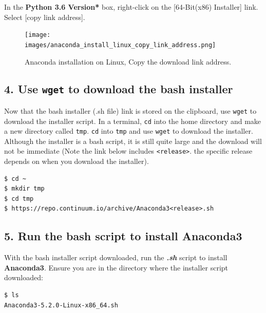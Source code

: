 \documentclass{book}
\begin{document}
In the \textbf{Python 3.6 Version* } box, right-click on the
{[}64-Bit(x86) Installer{]} link. Select {[}copy link address{]}.

\begin{figure}
\centering
\texttt{[image: images/anaconda\_install\_linux\_copy\_link\_address.png]}
\caption{Anaconda installation on Linux, Copy the download link
address.}
\end{figure}
    




    
        \subsection{\texorpdfstring{4. Use \texttt{wget} to download the bash
installer}{4. Use wget to download the bash installer}}\label{use-wget-to-download-the-bash-installer}

Now that the bash installer (.sh file) link is stored on the clipboard,
use \lstinline!wget! to download the installer script. In a terminal,
\lstinline!cd! into the home directory and make a new directory called
\lstinline!tmp!. \lstinline!cd! into \lstinline!tmp! and use
\lstinline!wget! to download the installer. Although the installer is a
bash script, it is still quite large and the download will not be
immediate (Note the link below includes \lstinline!<release>!. the
specific release depends on when you download the installer).

\begin{lstlisting}
$ cd ~
$ mkdir tmp
$ cd tmp
$ https://repo.continuum.io/archive/Anaconda3<release>.sh
\end{lstlisting}
    




    
        \subsection{\texorpdfstring{5. Run the bash script to install
\textbf{Anaconda3}}{5. Run the bash script to install Anaconda3}}\label{run-the-bash-script-to-install-anaconda3}

With the bash installer script downloaded, run the \textbf{\emph{.sh}}
script to install \textbf{Anaconda3}. Ensure you are in the directory
where the installer script downloaded:

\begin{lstlisting}
$ ls
Anaconda3-5.2.0-Linux-x86_64.sh
\end{lstlisting}
\end{document}
